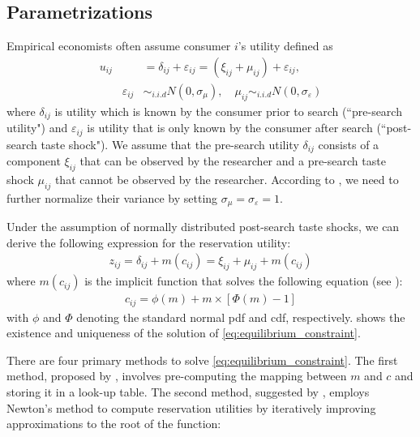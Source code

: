 \documentclass[12pt]{article}
\begin{document}
\subsection{Parametrizations}

Empirical economists often assume consumer $i$'s utility defined as
\begin{align}
    u_{i j} & =\delta_{i j}+\varepsilon_{i j}  =\left(\xi_{i j}+\mu_{i j}\right)+\varepsilon_{i j},\nonumber\\
    \quad \quad \varepsilon_{i j}&\sim_{i.i.d} N(0,\sigma_{\mu}),\quad \mu_{i j} \sim_{i.i.d} N(0,\sigma_{\varepsilon})\nonumber
\end{align}
where \(\delta_{i j}\) is utility which is known by the consumer prior to search (``pre-search
utility") and \(\varepsilon_{i j}\) is utility that is only known by the consumer
after search (``post-search taste shock"). 
We assume that the pre-search utility
\(\delta_{i j}\) consists of a component \(\xi_{i j}\) that can be observed by the researcher and a pre-search taste shock \(\mu_{i j}\) that
cannot be observed by the researcher. 
According to \cite{ursu2023sequential}, we need to further normalize their variance by setting $\sigma_{\mu}= \sigma_{\varepsilon} =1$. 

Under the assumption of normally distributed post-search taste shocks, we can derive the following
expression for the reservation utility:
\begin{align}
    z_{i j}=\delta_{i j}+m\left(c_{i j}\right)=\xi_{i j}+\mu_{i j}+m\left(c_{i j}\right) \nonumber
\end{align}
where \(m\left(c_{i j} \right)\) is the implicit function that solves the following equation (see \cite{kim2010online}):
\begin{align}
    c_{i j}=\phi(m)+m \times[\Phi(m)-1] \label{eq:equilibrium_constraint}
\end{align}
with \(\phi\) and \(\Phi\) denoting the standard normal pdf and cdf, respectively. \cite{weitzman1979optimal} shows the existence and uniqueness of the solution of \eqref{eq:equilibrium_constraint}.


There are four primary methods to solve \eqref{eq:equilibrium_constraint}. The first method, proposed by \cite{kim2010online}, involves pre-computing the mapping between \( m \) and \( c \) and storing it in a look-up table. The second method, suggested by \cite{jiang2021consumer}, employs Newton's method to compute reservation utilities by iteratively improving approximations to the root of the function:
\end{document}
